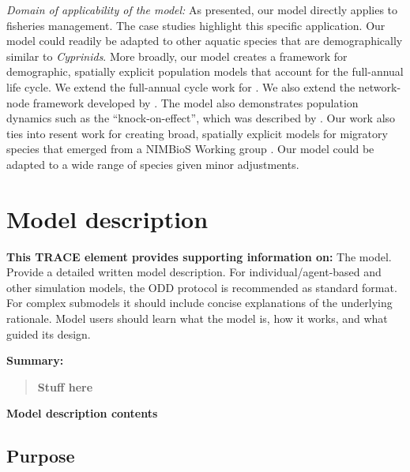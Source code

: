 \documentclass{article}[12pt]
\begin{document}
\textit{Domain of applicability of the model:}
As presented, our model directly applies to fisheries management.
The case studies highlight  this specific application.
Our model could readily be adapted to other aquatic species that are demographically similar to \textit{Cyprinids}. 
More broadly, our model creates a framework for demographic, spatially explicit population models that account for the full-annual life cycle.
We extend the full-annual cycle work for \citet{hostetler2015full}.
We also extend the network-node framework developed by \citet{Taylor:2010}.
The model also demonstrates population dynamics such as the ``knock-on-effect'', which was described by \citep{betini2015experimental}.
Our work also ties into resent work for creating broad, spatially explicit models for migratory species that emerged from a NIMBioS Working group \citep[e.g.,][]{wiederholt2017estimating, sample2017general, erickson2017defining, bieriGuide2018}.
Our model could be adapted to a wide range of species given minor adjustments. 





\section{Model description}\label{sec:md}
\textbf{This TRACE element provides supporting information on:} The model. Provide a detailed written model description. For individual/agent-based and other simulation models, the ODD protocol is recommended as standard format. For complex submodels it should include concise explanations of the underlying rationale. Model users should learn what the model is, how it works, and what guided its design.


\textbf{Summary:}
\begin{verse}
\textbf{
Stuff here
}
\end{verse}


 \textbf{Model description  contents}
\startcontents[sections]



\subsection{Purpose}
\end{document}
